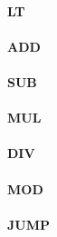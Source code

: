 \documentclass[12pt,a4paper]{article}
\begin{document}
\vspace{2em}\begin{minipage}{\textwidth}
\paragraph{LT}
\end{minipage}

\vspace{2em}\begin{minipage}{\textwidth}
\paragraph{ADD}
\end{minipage}

\vspace{2em}\begin{minipage}{\textwidth}
\paragraph{SUB}
\end{minipage}

\vspace{2em}\begin{minipage}{\textwidth}
\paragraph{MUL}
\end{minipage}

\vspace{2em}\begin{minipage}{\textwidth}
\paragraph{DIV}
\end{minipage}

\vspace{2em}\begin{minipage}{\textwidth}
\paragraph{MOD}
\end{minipage}

\vspace{2em}\begin{minipage}{\textwidth}
\paragraph{JUMP}
\end{minipage}
\end{document}
